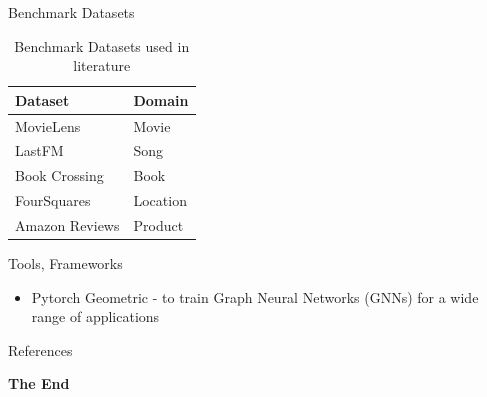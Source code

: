 \documentclass[aspectratio=169,xcolor=dvipsnames]{beamer}
\begin{document}
	\begin{frame}{Benchmark Datasets}
			\begin{table}
				\begin{tabular}{l l}
					\toprule
					\textbf{Dataset} & \textbf{Domain} \\
					\midrule
					MovieLens         & Movie           \\
					LastFM         & Song           \\
					Book Crossing         & Book          \\
					FourSquares         & Location          \\
					Amazon Reviews         & Product          \\
					\bottomrule
				\end{tabular}
				\caption{Benchmark Datasets used in literature}
			\end{table}
	\end{frame}
	\begin{frame}{Tools, Frameworks}
		\begin{itemize}
			\item Pytorch Geometric - to train Graph Neural Networks (GNNs) for a wide range of applications
		\end{itemize}
	\end{frame}
	
	\begin{frame}{References}
		\footnotesize
		
		
	\end{frame}
	
	\begin{frame}
		\Huge{\centerline{\textbf{The End}}}
	\end{frame}
	
	
\end{document}
